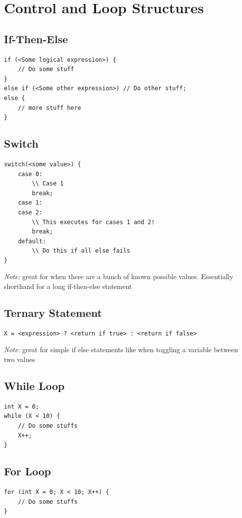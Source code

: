 \documentclass{article}
\begin{document}
\section{Control and Loop Structures}

\subsection{If-Then-Else}
\begin{lstlisting}
if (<Some logical expression>) {
	// Do some stuff
}
else if (<Some other expression>) // Do other stuff;
else {
	// more stuff here
}
\end{lstlisting}

\subsection{Switch}
\begin{lstlisting}
switch(<some value>) {
	case 0:
		\\ Case 1
		break;
	case 1:
	case 2:
		\\ This executes for cases 1 and 2!
		break;
	default:
		\\ Do this if all else fails
}
\end{lstlisting}
\emph{Note:} great for when there are a bunch of known possible values. Essentially shorthand for a long if-then-else statement

\subsection{Ternary Statement}
\begin{lstlisting}
X = <expression> ? <return if true> : <return if false>
\end{lstlisting}
\emph{Note:} great for simple if else statements like when toggling a variable between two values

\subsection{While Loop}
\begin{lstlisting}
int X = 0;
while (X < 10) {
	// Do some stuffs
	X++;
}
\end{lstlisting}

\subsection{For Loop}
\begin{lstlisting}
for (int X = 0; X < 10; X++) {
	// Do some stuffs
}
\end{lstlisting}
\end{document}
